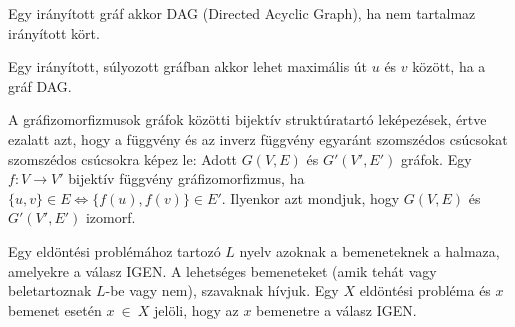   \begin{definition} [DAG]
    Egy irányított gráf akkor DAG (Directed Acyclic Graph), ha nem tartalmaz irányított kört.
  \end{definition}



  \begin{theorem} \label{max_route}
    Egy irányított, súlyozott gráfban akkor lehet maximális út $u$ és $v$ között, ha a gráf DAG.
  \end{theorem}

  \begin{definition} \label{grafizo}
    A gráfizomorfizmusok gráfok közötti bijektív struktúratartó leképezések, értve ezalatt azt, hogy a függvény és az inverz függvény egyaránt szomszédos csúcsokat szomszédos csúcsokra képez le:
    Adott $G(V,E)$ és $G'(V',E')$ gráfok. Egy $f:V \rightarrow V'$ bijektív függvény gráfizomorfizmus, ha $\{u,v\}\in E \Leftrightarrow \{f(u),f(v)\}\in E'$. Ilyenkor azt mondjuk, hogy $G(V,E)$ és $G'(V',E')$ izomorf.
  \end{definition}

  \begin{definition} \label{eldontesi_def}
    Egy eldöntési problémához tartozó $L$ nyelv azoknak a bemeneteknek a halmaza, amelyekre a válasz IGEN. A lehetséges bemeneteket (amik tehát vagy beletartoznak $L$-be vagy nem), szavaknak hívjuk. Egy $X$ eldöntési probléma és $x$ bemenet esetén $x~\in~X$ jelöli, hogy az $x$ bemenetre a válasz IGEN.
  \end{definition}

  \newpage

